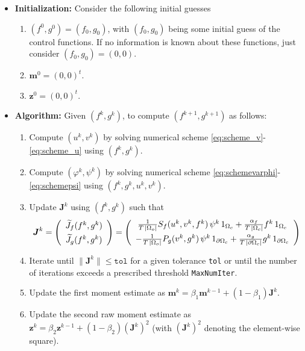 \documentclass[11pt]{article}
\def \m{\boldsymbol{m}}
\def \z{\boldsymbol{z}}
\def \J{\boldsymbol{J}}
\numberwithin{theorem}{section}
\begin{document}
\begin{itemize}
\item \textbf{Initialization:} Consider the following initial guesses
\begin{enumerate} 
\item $(f^0,g^0)=(f_0,g_0)$, with $(f_0,g_0)$ being some initial guess of the control functions. If no information is known about these functions, just consider $(f_0,g_0)=(0,0)$. 
\item $\m^0=(0,0)^t$.
\item $\z^0=(0,0)^t$.
\end{enumerate}
\item \textbf{Algorithm:}  Given $(f^k,g^k)$, to compute $(f^{k+1},g^{k+1})$ as follows:  
\begin{enumerate}
\item 
Compute $(u^k,v^k)$ by solving numerical scheme \eqref{eq:scheme_v}-\eqref{eq:scheme_u} using $(f^k,g^k)$. 
\item 
Compute $(\varphi^k,\psi^k)$ by solving numerical scheme \eqref{eq:schemevarphi}-\eqref{eq:schemepsi} using $(f^k,g^k, u^k,v ^k)$. 
\item
Update $\J^k$ using $(f^k,g^k)$ such that 
$$
\J^k=
\left(
\begin{array}{c}
  \widetilde J_f (f^k,g^k)  \\ 
    \noalign{\vspace{-2ex}}\\
     \widetilde J_g (f^k,g^k)
\end{array}
\right)
=
\left(
\begin{array}{c}
  \frac{1}{T\, |\Omega_o|} S_f(u ^k,v^k,f^k) \, \psi^k \, 1_{\Omega_c}+ 
  \frac{\alpha_f}{T\, |\Omega_c|} f^k  \, 1_{\Omega_c}
   \\
     \noalign{\vspace{-2ex}}\\
    - \frac{1}{T\,  |\Omega_o|} P_g(v ^k,g ^k) \, \psi^k \, 1_{\partial\Omega_c} + 
    \frac{\alpha_g}{T\, |\partial\Omega_c|} g^k \, 1_{\partial\Omega_c}
\end{array}
\right)
$$
\item Iterate until $\|\J^{k}\|\leq \texttt{tol}$ for a given tolerance \texttt{tol} or until the number of iterations exceeds a prescribed threshold \texttt{MaxNumIter}.
\item Update the first moment estimate as $\m^k=\beta_1\m^{k-1}+(1-\beta_1)\J^k$.
\item Update the second raw moment estimate as $\z^k=\beta_2\z^{k-1}+(1-\beta_2)(\J^k)^2$ (with $(\J^k)^2$ denoting the element-wise square).

\end{enumerate}
\end{itemize}
\end{document}
